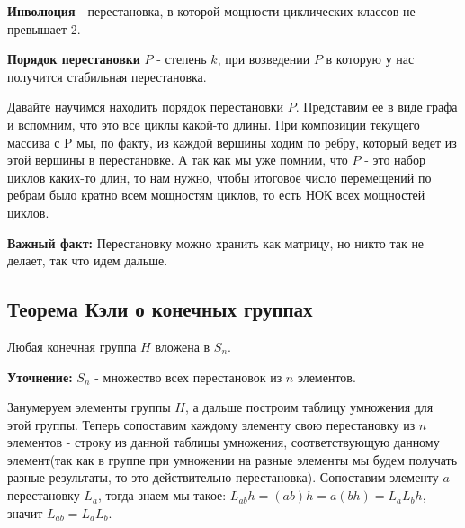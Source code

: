 \textbf{Инволюция} - перестановка, в которой мощности циклических классов не превышает 2.

\textbf{Порядок перестановки} $P$ - степень $k$, при возведении $P$ в которую у нас получится стабильная перестановка.

Давайте научимся находить порядок перестановки $P$. Представим ее в виде графа и вспомним, что это все циклы какой-то длины. При композиции текущего массива с P мы, по факту, из каждой вершины ходим по ребру, который ведет из этой вершины в перестановке. А так как мы уже помним, что $P$ - это набор циклов каких-то длин, то нам нужно, чтобы итоговое число перемещений по ребрам было кратно всем мощностям циклов, то есть НОК всех мощностей циклов.

\textbf{Важный факт:} Перестановку можно хранить как матрицу, но никто так не делает, так что идем дальше.

\subsection{Теорема Кэли о конечных группах} 
Любая конечная группа $H$ вложена в $S_n$.

\textbf{Уточнение:} $S_n$ - множество всех перестановок из $n$ элементов.

Занумеруем элементы группы $H$, а дальше построим таблицу умножения для этой группы. Теперь сопоставим каждому элементу свою перестановку из $n$ элементов - строку из данной таблицы умножения, соответствующую данному элемент(так как в группе при умножении на разные элементы мы будем получать разные результаты, то это действительно перестановка). Сопоставим элементу $a$ перестановку $L_a$, тогда знаем мы такое: $L_{ab}h=(ab)h=a(bh)=L_aL_bh$, значит $L_{ab}=L_aL_b$.

